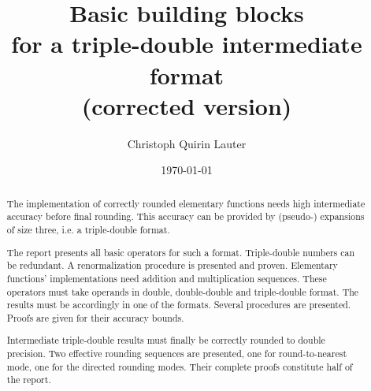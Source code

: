 \documentclass[a4paper,10pt,twoside]{article}
\title{Basic building blocks\\for a triple-double intermediate format\\{\small (corrected version)}}
\author{Christoph Quirin Lauter}
\date{\today}
\begin{document}
\maketitle

\begin{abstract}
The implementation of correctly rounded elementary functions needs high
intermediate accuracy before final rounding. This accuracy can be provided by (pseudo-)
expansions of size three, i.e. a triple-double format. 

The report presents all basic operators for such a format. Triple-double numbers can be
redundant. A renormalization procedure is presented and proven. Elementary functions' 
implementations need addition and multiplication sequences. These operators must take 
operands in double, double-double and triple-double format. The results must be accordingly
in one of the formats. Several procedures are presented. Proofs are given for their 
accuracy bounds.

Intermediate triple-double results must finally be correctly rounded to double precision. 
Two effective rounding sequences are presented, one for round-to-nearest mode, one for 
the directed rounding modes. Their complete proofs constitute half of the report. 
\end{abstract}
\end{document}
